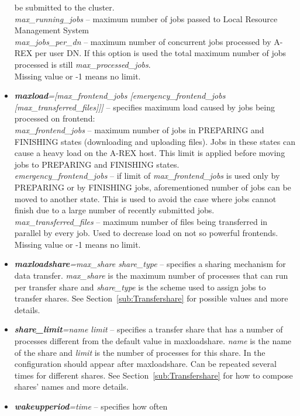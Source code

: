 \documentclass{article}                            %
\begin{document}
\begin{itemize}
be submitted to the cluster.\\
\textit{max\_running\_jobs} -- maximum number of jobs passed to Local
Resource Management System\\
\textit{max\_jobs\_per\_dn} -- maximum number of concurrent jobs processed by
A-REX per user DN. If this option is used the total maximum number of jobs
processed is still \textit{max\_processed\_jobs}.
\\ Missing value or -1 means no limit.
\item \textbf{\textit{maxload}}\textit{={[}max\_frontend\_jobs {[}emergency\_frontend\_jobs
{[}max\_transferred\_files]]]} -- specifies maximum load caused by
jobs being processed on frontend:\\
\textit{max\_frontend\_jobs} -- maximum number of jobs in PREPARING and
FINISHING states (downloading and uploading files). Jobs in these
states can cause a heavy load on the A-REX host. This limit is applied
before moving jobs to PREPARING and FINISHING states.\\
\textit{emergency\_frontend\_jobs} -- if limit of \textit{max\_frontend\_jobs}
is used only by PREPARING or by FINISHING jobs, aforementioned number
of jobs can be moved to another state. This is used to avoid the case
where jobs cannot finish due to a large number of recently submitted jobs.\\
\textit{max\_transferred\_files} -- maximum number of files being transferred
in parallel by every job. Used to decrease load on not so powerful
frontends.\\
Missing value or -1 means no limit.
\item \textbf{\textit{maxloadshare}}\textit{=max\_share share\_type} -- specifies a 
sharing mechanism for data transfer. \emph{max\_share} is the maximum
number of processes that can run per transfer share and \emph{share\_type} is 
the scheme used to assign jobs to transfer shares. See Section~\ref{sub:Transfershare}
for possible values and more details.
\item \textbf{\textit{share\_limit}}\textit{=name limit} -- specifies a transfer
share that has a number of processes different from the default value in
maxloadshare. \emph{name} is the name of the share and \emph{limit} is the 
number of processes for this share. In the configuration should appear after 
maxloadshare. Can be repeated several times for different shares.
See Section~\ref{sub:Transfershare} for how to compose shares' names and more
details.
\item \textbf{\textit{wakeupperiod}}\textit{=time} -- specifies how often

\end{itemize}
\end{document}
